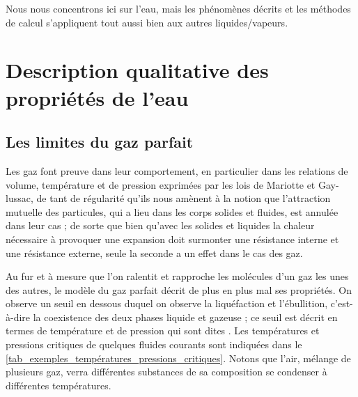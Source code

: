 		Nous nous concentrons ici sur l’eau, mais les phénomènes décrits et les méthodes de calcul s’appliquent tout aussi bien aux autres liquides/vapeurs.


\onlyframabook{\clearpage}
\section{Description qualitative des propriétés de l’eau}


	\subsection{Les limites du gaz parfait}

		Les gaz font preuve dans leur comportement, en particulier dans les relations de volume, température et de pression exprimées par les lois de Mariotte et Gay-lussac, de tant de régularité qu’ils nous amènent à la notion que l’attraction mutuelle des particules, qui a lieu dans les corps solides et fluides, est annulée dans leur cas ; de sorte que bien qu’avec les solides et liquides la chaleur nécessaire à provoquer une expansion doit surmonter une résistance interne et une résistance externe, seule la seconde a un effet dans le cas des gaz.
		
		Au fur et à mesure que l’on ralentit et rapproche les molécules d’un gaz les unes des autres, le modèle du gaz parfait décrit de plus en plus mal ses propriétés. On observe un seuil en dessous duquel on observe la liquéfaction et l’ébullition, c’est-à-dire la coexistence des deux phases liquide et gazeuse ; ce seuil est décrit en termes de température et de pression qui sont dites . Les températures et pressions critiques de quelques fluides courants sont indiquées dans le \cref{tab_exemples_températures_pressions_critiques}. Notons que l’air, mélange de plusieurs gaz, verra différentes substances de sa composition se condenser à différentes températures.

